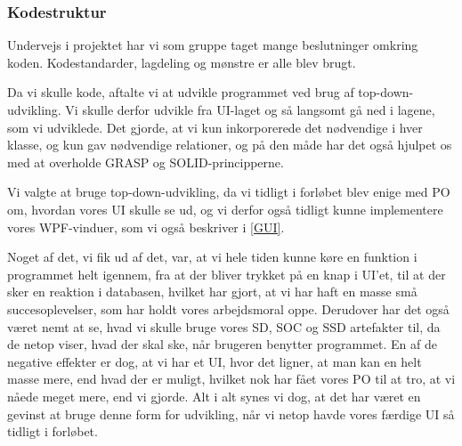 \subsubsection{Kodestruktur}

Undervejs i projektet har vi som gruppe taget mange beslutninger omkring koden.
Kodestandarder, lagdeling og mønstre er alle blev brugt. 

Da vi skulle kode, aftalte vi at udvikle programmet ved brug af top-down-udvikling.
Vi skulle derfor udvikle fra UI-laget og så langsomt gå ned i lagene, som vi udviklede.
Det gjorde, at vi kun inkorporerede det nødvendige i hver klasse, og kun gav nødvendige relationer, og på den måde har det også hjulpet os med at overholde GRASP og SOLID-principperne.

Vi valgte at bruge top-down-udvikling, da vi tidligt i forløbet blev enige med PO om, hvordan vores UI skulle se ud, og vi derfor også tidligt kunne implementere vores WPF-vinduer, som vi også beskriver i \ref{GUI}.

Noget af det, vi fik ud af det, var, at vi hele tiden kunne køre en funktion i programmet helt igennem, fra at der bliver trykket på en knap i UI'et, til at der sker en reaktion i databasen, hvilket har gjort, at vi har haft en masse små succesoplevelser, som har holdt vores arbejdsmoral oppe.
Derudover har det også været nemt at se, hvad vi skulle bruge vores SD, SOC og SSD artefakter til, da de netop viser, hvad der skal ske, når brugeren benytter programmet.
En af de negative effekter er dog, at vi har et UI, hvor det ligner, at man kan en helt masse mere, end hvad der er muligt, hvilket nok har fået vores PO til at tro, at vi nåede meget mere, end vi gjorde.
Alt i alt synes vi dog, at det har været en gevinst at bruge denne form for udvikling, når vi netop havde vores færdige UI så tidligt i forløbet.